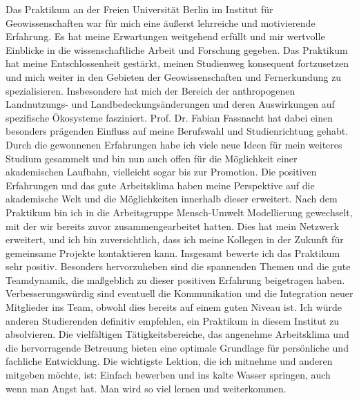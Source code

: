 \documentclass[12pt,a4paper]{report}
\begin{document}
Das Praktikum an der Freien Universität Berlin im Institut für
Geowissenschaften war für mich eine äußerst lehrreiche und motivierende
Erfahrung. Es hat meine Erwartungen weitgehend erfüllt und mir wertvolle
Einblicke in die wissenschaftliche Arbeit und Forschung gegeben.
Das Praktikum hat meine Entschlossenheit gestärkt, meinen Studienweg konsequent
fortzusetzen und mich weiter in den Gebieten der Geowissenschaften und
Fernerkundung zu spezialisieren. Insbesondere hat mich der Bereich der
anthropogenen Landnutzungs- und Landbedeckungsänderungen und deren Auswirkungen
auf spezifische Ökosysteme fasziniert. Prof. Dr. Fabian Fassnacht hat dabei
einen besonders prägenden Einfluss auf meine Berufswahl und Studienrichtung
gehabt. Durch die gewonnenen Erfahrungen habe ich viele neue Ideen für mein
weiteres Studium gesammelt und bin nun auch offen für die Möglichkeit einer
akademischen Laufbahn, vielleicht sogar bis zur Promotion.
Die positiven Erfahrungen und das gute Arbeitsklima haben meine Perspektive auf
die akademische Welt und die Möglichkeiten innerhalb dieser erweitert. Nach dem
Praktikum bin ich in die Arbeitsgruppe Mensch-Umwelt Modellierung gewechselt,
mit der wir bereits zuvor zusammengearbeitet hatten. Dies hat mein Netzwerk
erweitert, und ich bin zuversichtlich, dass ich meine Kollegen in der Zukunft
für gemeinsame Projekte kontaktieren kann.
Insgesamt bewerte ich das Praktikum sehr positiv. Besonders hervorzuheben sind
die spannenden Themen und die gute Teamdynamik, die maßgeblich zu dieser
positiven Erfahrung beigetragen haben. Verbesserungswürdig sind eventuell die
Kommunikation und die Integration neuer Mitglieder ins Team, obwohl dies
bereits auf einem guten Niveau ist.
Ich würde anderen Studierenden definitiv empfehlen, ein Praktikum in diesem
Institut zu absolvieren. Die vielfältigen Tätigkeitsbereiche, das angenehme
Arbeitsklima und die hervorragende Betreuung bieten eine optimale Grundlage für
persönliche und fachliche Entwicklung. Die wichtigste Lektion, die ich mitnehme
und anderen mitgeben möchte, ist: Einfach bewerben und ins kalte Wasser
springen, auch wenn man Angst hat. Man wird so viel lernen und
weiterkommen.
\end{document}
